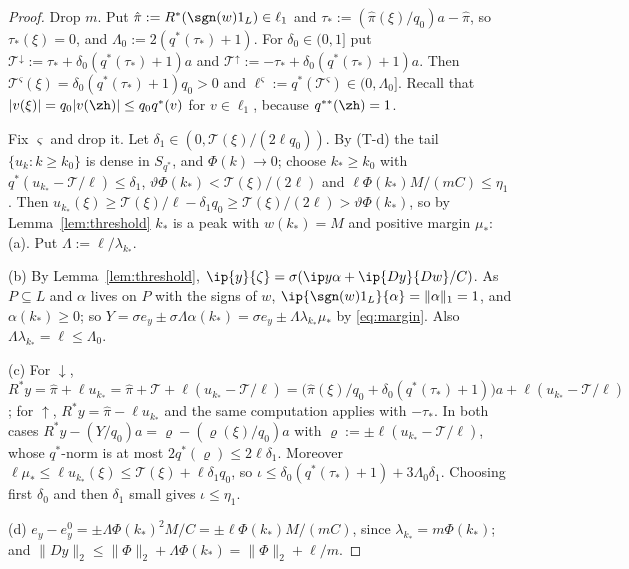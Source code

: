 \begin{proof}
Drop $m$.  Put $\hat\pi:=R^*(\sgn(w)1_L)\in\ell_1$ and
$\tau_*:=(\hat\pi(\xi)/q_0)a-\hat\pi$, so $\tau_*(\xi)=0$, and
$\Lambda_0:=2(q^*(\tau_*)+1)$.  For $\delta_0\in(0,1]$ put
$\mathcal T^\downarrow:=\tau_*+\delta_0(q^*(\tau_*)+1)a$ and $\mathcal
T^\uparrow:=-\tau_*+\delta_0(q^*(\tau_*)+1)a$.  Then $\mathcal
T^\varsigma(\xi)=\delta_0(q^*(\tau_*)+1)q_0>0$ and $\ell^\varsigma:=q^*(\mathcal
T^\varsigma)\in(0,\Lambda_0]$.  Recall that $|v(\xi)|=q_0|v(\zh)|\le q_0q^*(v)$
for $v\in\ell_1$, because $q^{**}(\zh)=1$.

Fix $\varsigma$ and drop it.  Let $\delta_1\in(0,\mathcal
T(\xi)/(2\ell q_0))$.  By (T-d) the tail $\{u_k:k\ge k_0\}$ is dense in
$S_{q^*}$, and $\Phi(k)\to0$; choose $k_*\ge k_0$ with $q^*(u_{k_*}-\mathcal
T/\ell)\le\delta_1$, $\vartheta\Phi(k_*)<\mathcal T(\xi)/(2\ell)$ and
$\ell\Phi(k_*)M/(mC)\le\eta_1$.  Then $u_{k_*}(\xi)\ge\mathcal
T(\xi)/\ell-\delta_1q_0\ge\mathcal T(\xi)/(2\ell)>\vartheta\Phi(k_*)$, so
by Lemma~\ref{lem:threshold} $k_*$ is a peak with $w(k_*)=M$ and positive
margin $\mu_*$: (a).  Put $\Lambda:=\ell/\lambda_{k_*}$.

(b) By Lemma~\ref{lem:threshold}, $\ip{y}{\zeta}=\sigma(\ip y\alpha+
\ip{Dy}{Dw}/C)$.  As $P\subseteq L$ and $\alpha$ lives on $P$ with the signs
of $w$, $\ip{\sgn(w)1_L}{\alpha}=\|\alpha\|_1=1$, and $\alpha(k_*)\ge0$; so
$Y=\sigma e_y\pm\sigma\Lambda\alpha(k_*)=\sigma e_y\pm\Lambda\lambda_{k_*}\mu_*$
by \eqref{eq:margin}.  Also $\Lambda\lambda_{k_*}=\ell\le\Lambda_0$.

(c) For $\downarrow$, $R^*y=\hat\pi+\ell u_{k_*}=\hat\pi+\mathcal T+\ell
(u_{k_*}-\mathcal T/\ell)=\big(\hat\pi(\xi)/q_0+\delta_0(q^*(\tau_*)+1)\big)a+
\ell(u_{k_*}-\mathcal T/\ell)$; for $\uparrow$, $R^*y=\hat\pi-\ell u_{k_*}$
and the same computation applies with $-\tau_*$.  In both cases
$R^*y-(Y/q_0)a=\varrho-(\varrho(\xi)/q_0)a$ with
$\varrho:=\pm\ell(u_{k_*}-\mathcal T/\ell)$, whose $q^*$-norm is at most
$2q^*(\varrho)\le2\ell\delta_1$.  Moreover $\ell\mu_*\le\ell u_{k_*}(\xi)\le
\mathcal T(\xi)+\ell\delta_1q_0$, so
$\iota\le\delta_0(q^*(\tau_*)+1)+3\Lambda_0\delta_1$.  Choosing first
$\delta_0$ and then $\delta_1$ small gives $\iota\le\eta_1$.

(d) $e_y-e^0_y=\pm\Lambda\Phi(k_*)^2M/C=\pm\ell\Phi(k_*)M/(mC)$, since
$\lambda_{k_*}=m\Phi(k_*)$; and $\|Dy\|_2\le\|\Phi\|_2+\Lambda\Phi(k_*)=
\|\Phi\|_2+\ell/m$.
\end{proof}

